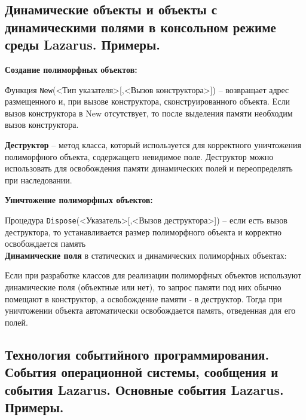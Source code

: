 \newpage\subsection{Динамические объекты и объекты с динамическими полями в консольном режиме среды 
Lazarus. Примеры. }

\begin{myquote}
            
\end{myquote}

\noindent
{\bf{Создание полиморфных объектов:}}

Функция \texttt{New}(<Тип указателя>[,<Вызов конструктора>]) – возвращает адрес размещенного и, при вызове конструктора, сконструированного объекта. Если вызов конструктора в New отсутствует, то после выделения памяти необходим вызов конструктора. 

{\bf{Деструктор}} – метод класса, который используется для корректного уничтожения полиморфного объекта, содержащего невидимое поле. Деструктор можно использовать для освобождения памяти динамических полей и переопределять при наследовании.

\noindent
{\bf{Уничтожение полиморфных объектов:}}

Процедура \texttt{Dispose}(<Указатель>[,<Вызов деструктора>]) – если есть вызов деструктора, то устанавливается размер полиморфного объекта и корректно освобождается память\\

\noindent
{\bf{Динамические поля}} в статических и динамических полиморфных 
объектах:

Если при разработке классов для реализации полиморфных объектов используют динамические поля (объектные или нет), то запрос памяти под них обычно помещают в конструктор, а освобождение памяти - в деструктор. Тогда при 
уничтожении объекта автоматически освобождается память, отведенная для его полей.





\newpage\subsection{Технология  событийного  программирования.  События  операционной  системы,  сообщения и события Lazarus. Основные события Lazarus. Примеры.}

\begin{myquote}
            
\end{myquote}

